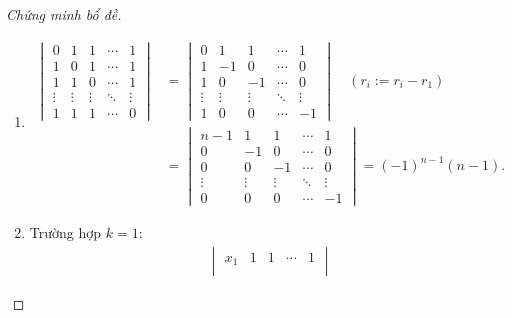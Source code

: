 \documentclass[class=linear-algebra,crop=false]{standalone}
\begin{document}
\begin{proof}[Chứng minh bổ đề]
	\begin{enumerate}[label = (\roman*)]
		\item
		      \begingroup{}
		      \allowdisplaybreaks{}
		      \begin{align*}
			      \begin{vmatrix}
				      0      & 1      & 1      & \cdots & 1      \\
				      1      & 0      & 1      & \cdots & 1      \\
				      1      & 1      & 0      & \cdots & 1      \\
				      \vdots & \vdots & \vdots & \ddots & \vdots \\
				      1      & 1      & 1      & \cdots & 0
			      \end{vmatrix}
			       & =
			      \begin{vmatrix}
				      0      & 1      & 1      & \cdots & 1      \\
				      1      & -1     & 0      & \cdots & 0      \\
				      1      & 0      & -1     & \cdots & 0      \\
				      \vdots & \vdots & \vdots & \ddots & \vdots \\
				      1      & 0      & 0      & \cdots & -1
			      \end{vmatrix}\quad(r_{i}:= r_{i} - r_{1}) \\
			       & =
			      \begin{vmatrix}
				      n-1    & 1      & 1      & \cdots & 1      \\
				      0      & -1     & 0      & \cdots & 0      \\
				      0      & 0      & -1     & \cdots & 0      \\
				      \vdots & \vdots & \vdots & \ddots & \vdots \\
				      0      & 0      & 0      & \cdots & -1
			      \end{vmatrix}
			      = {(-1)}^{n-1}(n-1).
		      \end{align*}
		      \endgroup{}
		\item
		      \par Trường hợp $k = 1$:
		      \begingroup{}
		      \allowdisplaybreaks{}
		      \begin{align*}
			      \begin{vmatrix}
				      x_{1}  & 1      & 1      & \cdots & 1      \\

\end{vmatrix}
\end{align*}
\end{enumerate}
\end{proof}
\end{document}
